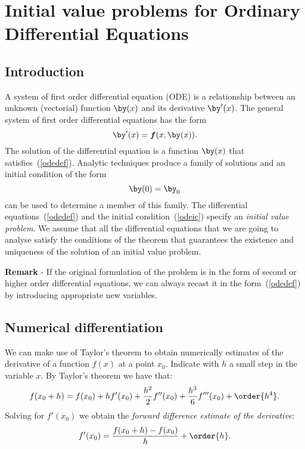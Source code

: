 
\chapter[Initial value problems]{Initial value problems for Ordinary Differential Equations}

\section{Introduction}

A system of first order differential equation (ODE) is a relationship
between an unknown (vectorial) function $\by(x)$ and its derivative
$\by'(x)$. The general system of first order differential equations
has the form
%
\begin{equation}
  \by'(x)=\boldsymbol{f}(x,\by(x)). \label{odedef}
\end{equation}
%
The solution of the differential equation is a function $\by(x)$ that
satisfies~(\ref{odedef}). Analytic techniques produce a family of
solutions and an initial condition of the form
%
\begin{equation}\label{odeic}
  \by(0)= \by_0
\end{equation}
%
can be used to determine a member of this family. The differential
equations~(\ref{odedef}) and the initial condition~(\ref{odeic})
specify an {\it initial value problem}.  We assume that all the
differential equations that we are going to analyse satisfy the
conditions of the theorem that guarantees the existence and uniqueness
of the solution of an initial value problem.

\noindent \textbf{Remark} - If the original formulation of the problem
is in the form of second or higher order differential equations, we
can always recast it in the form~(\ref{odedef}) by introducing
appropriate new variables.

\section{Numerical differentiation}

We can make use of Taylor's theorem to obtain numerically estimates of
the derivative of a function $f(x)$ at a point $x_0$.  Indicate with
$h$ a small step in the variable $x$.  By Taylor's theorem we have
that:
%
\begin{equation}
  f(x_0+h) = f(x_0) + h f'(x_0) + \frac{h^2}{2} f''(x_0) +
  \frac{h^3}{6} f'''(x_0) + \order{h^4} .
  \label{IVP.eq:1}
\end{equation}
%
Solving for $f'(x_0)$ we obtain the \textit{forward difference
  estimate of the derivative}:
%
\begin{equation}
  f'(x_0) = \frac{f(x_0+h)-f(x_0)}{h} + \order{h} .
  \label{IVP.eq:2}
\end{equation}

